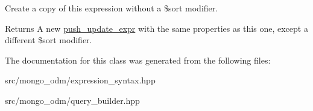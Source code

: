 Create a copy of this expression without a \$sort modifier. 

\begin{DoxyReturn}{Returns}
A new \hyperlink{classmongo__odm_1_1push__update__expr}{push\+\_\+update\+\_\+expr} with the same properties as this one, except a different \$sort modifier. 
\end{DoxyReturn}


The documentation for this class was generated from the following files\+:\begin{DoxyCompactItemize}
\item 
src/mongo\+\_\+odm/expression\+\_\+syntax.\+hpp\item 
src/mongo\+\_\+odm/query\+\_\+builder.\+hpp\end{DoxyCompactItemize}
